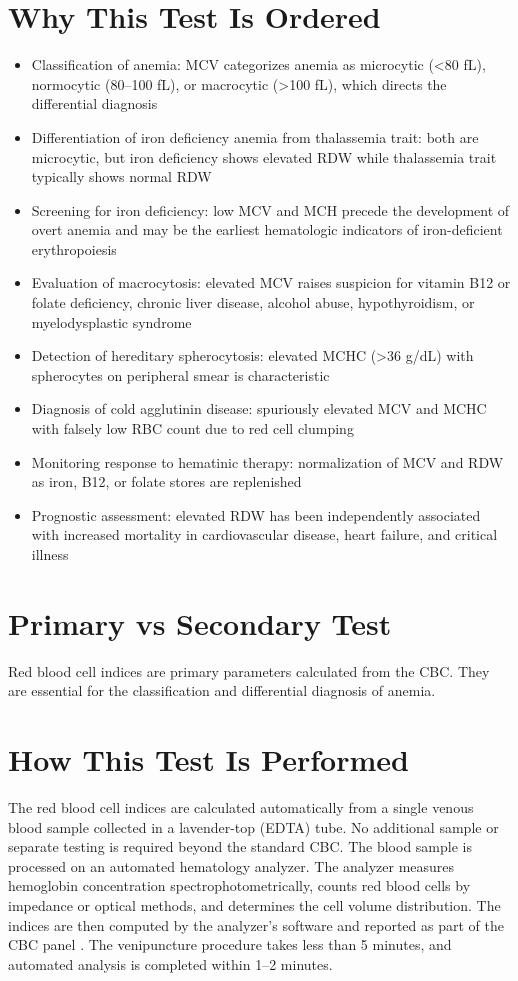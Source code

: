 \section*{Why This Test Is Ordered}
\begin{itemize}
  \item Classification of anemia: MCV categorizes anemia as microcytic (<80 fL), normocytic (80--100 fL), or macrocytic (>100 fL), which directs the differential diagnosis \cite{kaushansky2021williams}
  \item Differentiation of iron deficiency anemia from thalassemia trait: both are microcytic, but iron deficiency shows elevated RDW while thalassemia trait typically shows normal RDW
  \item Screening for iron deficiency: low MCV and MCH precede the development of overt anemia and may be the earliest hematologic indicators of iron-deficient erythropoiesis
  \item Evaluation of macrocytosis: elevated MCV raises suspicion for vitamin B12 or folate deficiency, chronic liver disease, alcohol abuse, hypothyroidism, or myelodysplastic syndrome
  \item Detection of hereditary spherocytosis: elevated MCHC (>36 g/dL) with spherocytes on peripheral smear is characteristic
  \item Diagnosis of cold agglutinin disease: spuriously elevated MCV and MCHC with falsely low RBC count due to red cell clumping
  \item Monitoring response to hematinic therapy: normalization of MCV and RDW as iron, B12, or folate stores are replenished
  \item Prognostic assessment: elevated RDW has been independently associated with increased mortality in cardiovascular disease, heart failure, and critical illness
\end{itemize}

\section*{Primary vs Secondary Test}
Red blood cell indices are primary parameters calculated from the CBC. They are essential for the classification and differential diagnosis of anemia.

\section*{How This Test Is Performed}
The red blood cell indices are calculated automatically from a single venous blood sample collected in a lavender-top (EDTA) tube. No additional sample or separate testing is required beyond the standard CBC. The blood sample is processed on an automated hematology analyzer. The analyzer measures hemoglobin concentration spectrophotometrically, counts red blood cells by impedance or optical methods, and determines the cell volume distribution. The indices are then computed by the analyzer's software and reported as part of the CBC panel \cite{bain2017dacie}. The venipuncture procedure takes less than 5 minutes, and automated analysis is completed within 1--2 minutes.


